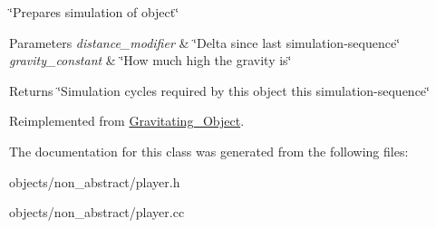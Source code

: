 \char`\"{}\+Prepares simulation of object\char`\"{} 


\begin{DoxyParams}{Parameters}
{\em distance\+\_\+modifier} & \char`\"{}\+Delta since last simulation-\/sequence\char`\"{} \\
\hline
{\em gravity\+\_\+constant} & \char`\"{}\+How much high the gravity is\char`\"{} \\
\hline
\end{DoxyParams}
\begin{DoxyReturn}{Returns}
\char`\"{}\+Simulation cycles required by this object this simulation-\/sequence\char`\"{} 
\end{DoxyReturn}


Reimplemented from \hyperlink{classGravitating__Object_a187404d6df6ff16a86a33a3f4a8aab85}{Gravitating\+\_\+\+Object}.



The documentation for this class was generated from the following files\+:\begin{DoxyCompactItemize}
\item 
objects/non\+\_\+abstract/player.\+h\item 
objects/non\+\_\+abstract/player.\+cc\end{DoxyCompactItemize}

